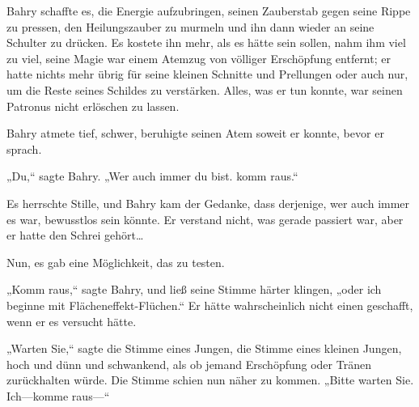 Bahry schaffte es, die Energie aufzubringen, seinen Zauberstab gegen seine Rippe zu pressen, den Heilungszauber zu murmeln und ihn dann wieder an seine Schulter zu drücken. Es kostete ihn mehr, als es hätte sein sollen, nahm ihm viel zu viel, seine Magie war einem Atemzug von völliger Erschöpfung entfernt; er hatte nichts mehr übrig für seine kleinen Schnitte und Prellungen oder auch nur, um die Reste seines Schildes zu verstärken. Alles, was er tun konnte, war seinen Patronus nicht erlöschen zu lassen.

Bahry atmete tief, schwer, beruhigte seinen Atem soweit er konnte, bevor er sprach.

„Du,“ sagte Bahry. „Wer auch immer du bist. komm raus.“

Es herrschte Stille, und Bahry kam der Gedanke, dass derjenige, wer auch immer es war, bewusstlos sein könnte. Er verstand nicht, was gerade passiert war, aber er hatte den Schrei gehört…

Nun, es gab eine Möglichkeit, das zu testen.

„Komm raus,“ sagte Bahry, und ließ seine Stimme härter klingen, „oder ich beginne mit Flächeneffekt-Flüchen.“ Er hätte wahrscheinlich nicht einen geschafft, wenn er es versucht hätte.

„Warten Sie,“ sagte die Stimme eines Jungen, die Stimme eines kleinen Jungen, hoch und dünn und schwankend, als ob jemand Erschöpfung oder Tränen zurückhalten würde. Die Stimme schien nun näher zu kommen. „Bitte warten Sie. Ich—komme raus—“

